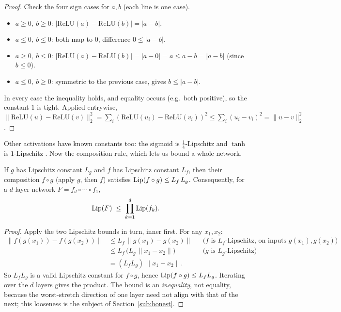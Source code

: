 \begin{proof}
Check the four sign cases for $a,b$ (each line is one case).
\begin{itemize}[nosep]
  \item $a\ge0,\ b\ge0$: $|\mathrm{ReLU}(a)-\mathrm{ReLU}(b)|=|a-b|$.
  \item $a\le0,\ b\le0$: both map to $0$, difference $0\le|a-b|$.
  \item $a\ge0,\ b\le0$: $|\mathrm{ReLU}(a)-\mathrm{ReLU}(b)|=|a-0|=a\le a-b=|a-b|$ (since $b\le0$).
  \item $a\le0,\ b\ge0$: symmetric to the previous case, gives $b\le|a-b|$.
\end{itemize}
In every case the inequality holds, and equality occurs (e.g.\ both positive), so the constant $1$ is tight. Applied entrywise, $\|\mathrm{ReLU}(u)-\mathrm{ReLU}(v)\|_2^2=\sum_i(\mathrm{ReLU}(u_i)-\mathrm{ReLU}(v_i))^2\le\sum_i(u_i-v_i)^2=\|u-v\|_2^2$.
\end{proof}

Other activations have known constants too: the sigmoid is $\tfrac14$-Lipschitz and $\tanh$ is $1$-Lipschitz \citep{tsuzuku2018lipschitz}. Now the composition rule, which lets us bound a whole network.

\begin{theorem}
\label{thm:composition}
If $g$ has Lipschitz constant $L_g$ and $f$ has Lipschitz constant $L_f$, then their composition $f\circ g$ (apply $g$, then $f$) satisfies $\operatorname{Lip}(f\circ g)\le L_f\,L_g$. Consequently, for a $d$-layer network $F=f_d\circ\cdots\circ f_1$,
\[
  \operatorname{Lip}(F) \;\le\; \prod_{k=1}^{d} \operatorname{Lip}(f_k).
\]
\end{theorem}

\begin{proof}
Apply the two Lipschitz bounds in turn, inner first. For any $x_1,x_2$:
\begin{align*}
  \|f(g(x_1))-f(g(x_2))\|
   &\le L_f\,\|g(x_1)-g(x_2)\| &&\text{(}f\text{ is }L_f\text{-Lipschitz, on inputs }g(x_1),g(x_2)\text{)}\\
   &\le L_f\,\big(L_g\,\|x_1-x_2\|\big) &&\text{(}g\text{ is }L_g\text{-Lipschitz)}\\
   &= (L_f L_g)\,\|x_1-x_2\| .
\end{align*}
So $L_fL_g$ is a valid Lipschitz constant for $f\circ g$, hence $\operatorname{Lip}(f\circ g)\le L_fL_g$. Iterating over the $d$ layers gives the product. The bound is an \emph{inequality}, not equality, because the worst-stretch direction of one layer need not align with that of the next; this looseness is the subject of Section~\ref{sub:honest}.
\end{proof}

